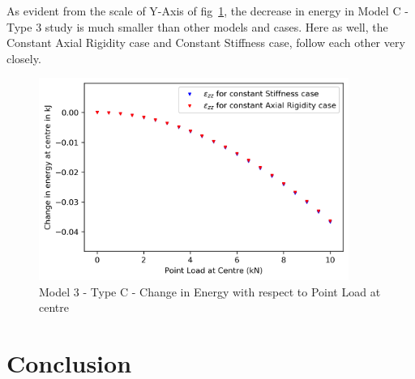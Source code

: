 As evident from the scale of Y-Axis of fig~\ref{fig:M3_c_energy}, the decrease in energy in Model C - Type 3 study is much smaller than other models and cases. Here as well, the Constant Axial Rigidity case and Constant Stiffness case, follow each other very closely.

\begin{figure}[!htbp]
    \centering
    \includegraphics[width = 0.9\textwidth]{Figures/M3_c_energy.png}
    \caption{Model 3 - Type C - Change in Energy with respect to Point Load at centre}
    \label{fig:M3_c_energy}
\end{figure}

\newpage
\section{Conclusion}

